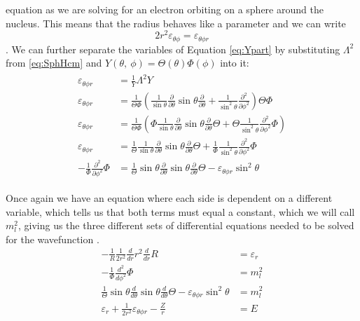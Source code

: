 \documentclass[../master_thesis.tex]{subfiles}
\begin{document}
equation as we are solving for an electron orbiting on a sphere around the nucleus.
This means that the radius behaves like a parameter and we can write
$$2r^2\varepsilon_{\theta\phi} = \varepsilon_{\theta\phi r}$$.
We can further separate the variables of Equation \ref{eq:Ypart} by substituting
$\Lambda^2$ from \ref{eq:SphHcm} and $Y(\theta, \ \phi) = \Theta(\theta)\Phi(\phi)$
into it:
\begin{align}
  \begin{split}
    \varepsilon_{\theta\phi r} &= \frac{1}{Y}\Lambda^2Y\\
    \varepsilon_{\theta\phi r} &= \frac{1}{\Theta\Phi}\left(\frac{1}{\sin{\theta}}\frac{\partial}{
                 \partial\theta}\sin{\theta}\frac{\partial}{\partial\theta}
                 + \frac{1}{\sin^2{\theta}}\frac{\partial^2}{\partial\phi^2}\right)
                 \Theta\Phi\\
    \varepsilon_{\theta\phi r} &= \frac{1}{\Theta\Phi}\left(\Phi\frac{1}{\sin{\theta}}\frac{\partial}{
                  \partial\theta}\sin{\theta}\frac{\partial}{\partial\theta}\Theta
                  + \Theta\frac{1}{\sin^2{\theta}}\frac{\partial^2}{\partial\phi^2}\Phi\right)\\
    \varepsilon_{\theta\phi r} &= \frac{1}{\Theta}\frac{1}{\sin{\theta}}\frac{\partial}{
                 \partial\theta}\sin{\theta}\frac{\partial}{\partial\theta}\Theta
                 + \frac{1}{\Phi}\frac{1}{\sin^2{\theta}}\frac{\partial^2}{\partial\phi^2}\Phi\\
    -\frac{1}{\Phi}\frac{\partial^2}{\partial\phi^2}\Phi &=  \frac{1}{\Theta}\sin{\theta}\frac{\partial}{
                 \partial\theta}\sin{\theta}\frac{\partial}{\partial\theta}\Theta - \varepsilon_{\theta\phi r}\sin^2{\theta}
  \end{split}
\end{align}

Once again we have an equation where each side is dependent on a different variable,
which tells us that both terms must equal a constant, which we will call $m_l^2$, giving us the
three different sets of differential equations needed to be solved for the
wavefunction \cite{Atkins:2014, Simons:2016, Atkins:2011}.
\begin{subequations}
  \begin{align}
    -\frac{1}{R}\frac{1}{2r^2}\frac{d}{d r}
    r^2\frac{d}{d r}R &= \varepsilon_r\label{eq:Radeq}\\
    -\frac{1}{\Phi}\frac{d^2}{d\phi^2}\Phi &= m_l^2\label{eq:phieq}\\
    \frac{1}{\Theta}\sin{\theta}\frac{d}{d\theta}\sin{\theta}
    \frac{d}{d\theta}\Theta -\varepsilon_{\theta\phi r}
    \sin^2{\theta} &= m_l^2 \label{eq:thetaeq}\\
    \varepsilon_r + \frac{1}{2r^2}\varepsilon_{\theta\phi r} - \frac{Z}{r} &= E
  \end{align}
\end{subequations}
\end{document}

